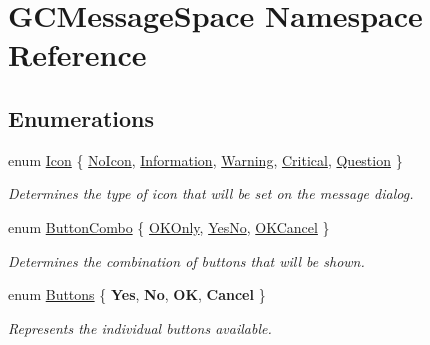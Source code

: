 \hypertarget{namespace_g_c_message_space}{\section{\-G\-C\-Message\-Space \-Namespace \-Reference}
\label{namespace_g_c_message_space}
}
\subsection*{\-Enumerations}
\begin{DoxyCompactItemize}
\item 
enum \hyperlink{namespace_g_c_message_space_a67e94586e09cbc305257fbcdd7b686e2}{\-Icon} \{ \*
\hyperlink{namespace_g_c_message_space_a67e94586e09cbc305257fbcdd7b686e2a54bba077357d6db019fb791266e133f0}{\-No\-Icon}, 
\hyperlink{namespace_g_c_message_space_a67e94586e09cbc305257fbcdd7b686e2aa675bd9dc6c7b7735b0c1c20954b8323}{\-Information}, 
\hyperlink{namespace_g_c_message_space_a67e94586e09cbc305257fbcdd7b686e2ab454bae3ed7cef63f273c303aea6c4c3}{\-Warning}, 
\hyperlink{namespace_g_c_message_space_a67e94586e09cbc305257fbcdd7b686e2a4e02f76ed3971c8adbee5dd44724e8a6}{\-Critical}, 
\*
\hyperlink{namespace_g_c_message_space_a67e94586e09cbc305257fbcdd7b686e2ae66d6709c87ccb0832b1456e2b4ad895}{\-Question}
 \}
\begin{DoxyCompactList}\small\item\em \-Determines the type of icon that will be set on the message dialog. \end{DoxyCompactList}\item 
enum \hyperlink{namespace_g_c_message_space_ac1db082c29062fe6508ba03bf76bea44}{\-Button\-Combo} \{ \hyperlink{namespace_g_c_message_space_ac1db082c29062fe6508ba03bf76bea44a3baa10aa8947d81b9001802c55131570}{\-O\-K\-Only}, 
\hyperlink{namespace_g_c_message_space_ac1db082c29062fe6508ba03bf76bea44ab2defe87f3e886edf34f537f4ac8c282}{\-Yes\-No}, 
\hyperlink{namespace_g_c_message_space_ac1db082c29062fe6508ba03bf76bea44a7de67bd6b388b96a468fcf8246dfdece}{\-O\-K\-Cancel}
 \}
\begin{DoxyCompactList}\small\item\em \-Determines the combination of buttons that will be shown. \end{DoxyCompactList}\item 
enum \hyperlink{namespace_g_c_message_space_a631906a7d53f30328cf2249a00078b5b}{\-Buttons} \{ {\bfseries \-Yes}, 
{\bfseries \-No}, 
{\bfseries \-O\-K}, 
{\bfseries \-Cancel}
 \}
\begin{DoxyCompactList}\small\item\em \-Represents the individual buttons available. \end{DoxyCompactList}\end{DoxyCompactItemize}

